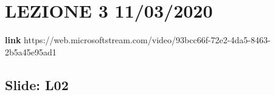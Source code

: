 \section{LEZIONE 3 11/03/2020}
\textbf{link} https://web.microsoftstream.com/video/93bcc66f-72e2-4da5-8463-2b5a45e95ad1
\subsection{Slide: L02}
